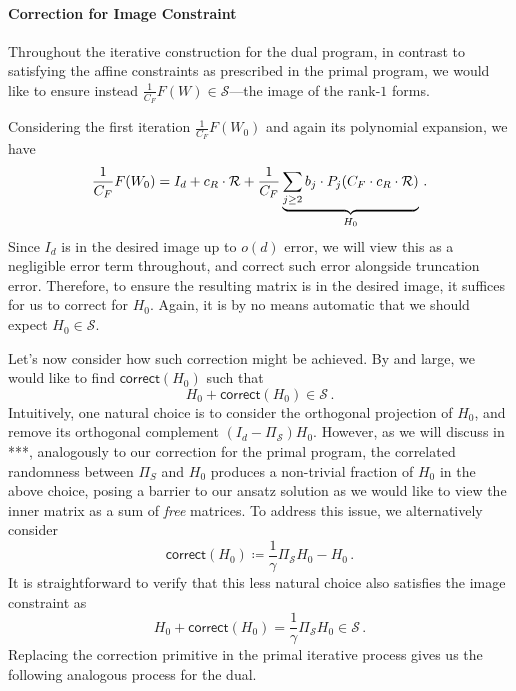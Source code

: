 \documentclass[12pt]{article}
\newcommand{\calR}{\mathcal{R}}
\newcommand{\calS}{\mathcal{S}}
\newcommand{\gam}{\gamma}
\newcommand{\corr}{\mathsf{correct}}
\begin{document}
\paragraph{Correction for Image Constraint} Throughout the iterative construction for the dual program, in contrast to satisfying the affine constraints as prescribed in the primal program, we would like to ensure instead $\frac{1}{C_F} F(W) \in \calS $---the image of the rank-$1$ forms. 

 Considering the first iteration $\frac{1}{C_F} F(W_0)$ and again its polynomial expansion, we have \[
\frac{1}{C_F} F(W_0) = I_d + c_R \cdot \calR + \frac{1}{C_F} \underbrace{ \sum_{j\ge 2} b_j\cdot  P_j(C_F \cdot c_R \cdot \cal R ) }_{H_0}\,.
 \]
 Since $I_d$ is in the desired image up to $o(d)$ error, we will view this as a negligible error term throughout, and correct such error alongside truncation error. Therefore, to ensure the resulting matrix is in the desired image, it suffices for us to correct for $H_0$. Again, it is by no means automatic that we should expect $H_0\in \calS$.
 
 Let's now consider how such correction might be achieved. By and large, we would like to find $\corr(H_0)$ such that \[
 H_0 + \corr(H_0) \in \calS\,.
 \] 
 Intuitively, one natural choice is to consider the orthogonal projection of $H_0$, and remove its orthogonal complement $(I_d - \Pi_\calS) H_0$. However, as we will discuss in ***, analogously to our correction for the primal program, the correlated randomness between $\Pi_S$ and $H_0$ produces a non-trivial fraction of $H_0$ in the above choice, posing a barrier to our ansatz solution as we would like to view the inner matrix as a sum of \textit{free} matrices. To address this issue, we alternatively consider \[ 
 \corr(H_0) \coloneqq \frac{1}{\gam }     \Pi_{\calS}   H_0- H_0 \,.
 \] 
It is straightforward to verify that this less natural choice also satisfies the image constraint as \[ 
H_0 + \corr(H_0) = \frac{1}{\gamma} \Pi_{\calS} H_0 \in \calS \,.
\]
Replacing the correction primitive in the primal iterative process gives us the following analogous process for the dual.
\end{document}
